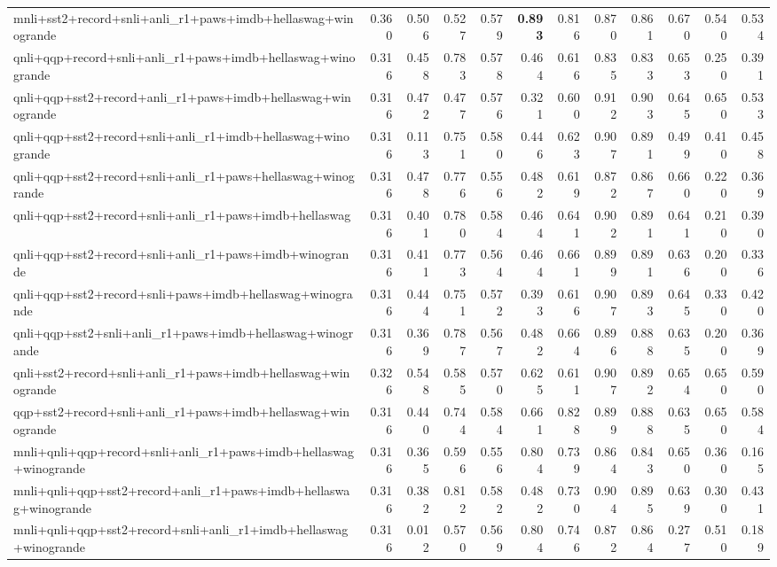 \begin{table}[t]
\begin{tabular}{lrrrrrrrrrrr}
    mnli+sst2+record+snli+anli\_r1+paws+imdb+hellaswag+winogrande & 0.360 & 0.506 & 0.527 & 0.579 & \textbf{0.893} & 0.816 & 0.870 & 0.861 & 0.670 & 0.540 & 0.534 \\
    qnli+qqp+record+snli+anli\_r1+paws+imdb+hellaswag+winogrande & 0.316 & 0.458 & 0.783 & 0.578 & 0.464 & 0.616 & 0.835 & 0.833 & 0.653 & 0.250 & 0.391 \\
    qnli+qqp+sst2+record+anli\_r1+paws+imdb+hellaswag+winogrande & 0.316 & 0.472 & 0.477 & 0.576 & 0.321 & 0.600 & 0.912 & 0.903 & 0.645 & 0.650 & 0.533 \\
    qnli+qqp+sst2+record+snli+anli\_r1+imdb+hellaswag+winogrande & 0.316 & 0.113 & 0.751 & 0.580 & 0.446 & 0.623 & 0.907 & 0.891 & 0.499 & 0.410 & 0.458 \\
    qnli+qqp+sst2+record+snli+anli\_r1+paws+hellaswag+winogrande & 0.316 & 0.478 & 0.776 & 0.556 & 0.482 & 0.619 & 0.872 & 0.867 & 0.660 & 0.220 & 0.369 \\
    qnli+qqp+sst2+record+snli+anli\_r1+paws+imdb+hellaswag & 0.316 & 0.401 & 0.780 & 0.584 & 0.464 & 0.641 & 0.902 & 0.891 & 0.641 & 0.210 & 0.390 \\
    qnli+qqp+sst2+record+snli+anli\_r1+paws+imdb+winogrande & 0.316 & 0.411 & 0.773 & 0.564 & 0.464 & 0.661 & 0.899 & 0.891 & 0.636 & 0.200 & 0.336 \\
    qnli+qqp+sst2+record+snli+paws+imdb+hellaswag+winogrande & 0.316 & 0.444 & 0.751 & 0.572 & 0.393 & 0.616 & 0.907 & 0.893 & 0.645 & 0.330 & 0.420 \\
    qnli+qqp+sst2+snli+anli\_r1+paws+imdb+hellaswag+winogrande & 0.316 & 0.369 & 0.787 & 0.567 & 0.482 & 0.664 & 0.896 & 0.888 & 0.635 & 0.200 & 0.369 \\
    qnli+sst2+record+snli+anli\_r1+paws+imdb+hellaswag+winogrande & 0.326 & 0.548 & 0.585 & 0.570 & 0.625 & 0.611 & 0.907 & 0.892 & 0.654 & 0.650 & 0.590 \\
    qqp+sst2+record+snli+anli\_r1+paws+imdb+hellaswag+winogrande & 0.316 & 0.440 & 0.744 & 0.584 & 0.661 & 0.828 & 0.899 & 0.888 & 0.635 & 0.650 & 0.584 \\
    \addlinespace
    mnli+qnli+qqp+record+snli+anli\_r1+paws+imdb+hellaswag+winogrande & 0.316 & 0.365 & 0.596 & 0.556 & 0.804 & 0.739 & 0.864 & 0.843 & 0.650 & 0.360 & 0.165 \\
    mnli+qnli+qqp+sst2+record+anli\_r1+paws+imdb+hellaswag+winogrande & 0.316 & 0.382 & 0.812 & 0.582 & 0.482 & 0.730 & 0.904 & 0.895 & 0.639 & 0.300 & 0.431 \\
    mnli+qnli+qqp+sst2+record+snli+anli\_r1+imdb+hellaswag+winogrande & 0.316 & 0.012 & 0.570 & 0.569 & 0.804 & 0.746 & 0.872 & 0.864 & 0.277 & 0.510 & 0.189 \\

\end{tabular}
\end{table}
